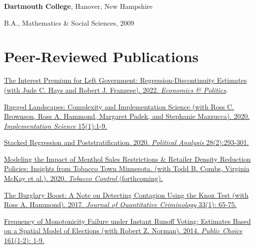 \documentclass[margin,line]{res}
\newenvironment{list1}{
  \begin{list}{}{%
      \setlength{\itemsep}{0.1in}
      \setlength{\parsep}{0in} \setlength{\parskip}{0in}
      \setlength{\topsep}{0.1in} \setlength{\partopsep}{0in} 
      \setlength{\leftmargin}{0.17in}}}{\end{list}}
\newenvironment{publist}{
	\begin{list}{}{%
			\setlength{\itemsep}{0.15in}
			\setlength{\parsep}{0in} \setlength{\parskip}{0in}
			\setlength{\topsep}{0in} \setlength{\partopsep}{0in} 
			\setlength{\leftmargin}{0.15in}
			\setlength{\itemindent}{-0.15in}}}
		{\end{list}}
\begin{document}
\begin{resume}
{\bf Dartmouth College}, Hanover, New Hampshire
\begin{list1}
\item[] B.A., Mathematics \& Social Sciences, 2009
\end{list1}




\section{\sc Peer-Reviewed Publications}

\begin{publist}
	
	\item \href{https://onlinelibrary.wiley.com/doi/abs/10.1111/ecpo.12204}{The Interest Premium for Left Government: Regression-Discontinuity Estimates (with Jude C. Hays and Robert J. Franzese). 2022. \textit{Economics \& Politics}}.
			
	\item \href{https://link.springer.com/article/10.1186/s13012-020-01028-5}{Rugged Landscapes: Complexity and Implementation Science (with Ross C. Brownson, Ross A. Hammond, Margaret Padek, and Stephanie Mazzucca). 2020. \textit{Implementation Science} 15(1):1-9.}
	
	\item \href{https://doi.org/10.1017/pan.2019.43}{Stacked Regression and Poststratification. 2020. \textit{Political Analysis} 28(2):293-301.}
	
	\item \href{http://dx.doi.org/10.1136/tobaccocontrol-2019-054986}{Modeling the Impact of Menthol Sales Restrictions \& Retailer Density Reduction Policies: Insights from Tobacco Town Minnesota. (with Todd B. Combs, Virginia McKay et al.). 2020. \textit{Tobacco Control} (forthcoming).}
	
	\item \href{https://joeornstein.github.io/publications/Ornstein-Hammond2017.pdf}{The Burglary Boost: A Note on Detecting Contagion Using the Knox Test (with Ross A. Hammond). 2017. \textit{Journal of Quantitative Criminology} 33(1): 65-75.}
	
	\item \href{https://joeornstein.github.io/publications/Ornstein-Norman-2014/Ornstein-Norman-2014.pdf}{Frequency of Monotonicity Failure under Instant Runoff Voting: Estimates Based on a Spatial Model of Elections (with Robert Z. Norman). 2014. \textit{Public Choice} 161(1-2): 1-9.}
	

\end{publist}
\end{resume}
\end{document}
